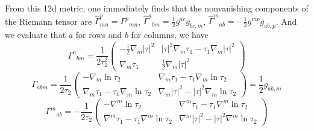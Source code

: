 From this 12d metric, one immediately finds that the nonvanishing components of the Riemann tensor are $\hat{\Gamma}^p_{mn} = \Gamma^p{}_{mn}$, $\hat{\Gamma}^a{}_{bm} = \frac{1}{2}g^{ac}g_{bc,m}$, $\hat{\Gamma}^m{}_{ab} = - \frac{1}{2}g^{mp}g_{ab,p}$.
And we evaluate that $a$ for rows and $b$ for columns, we have
\begin{equation}
\Gamma^a{}_{bm}
=\frac{1}{2 \tau_2^2}\begin{pmatrix}
    -\tfrac12 \nabla_m|\tau|^2 & |\tau|^2\nabla_m\tau_1 - \tau_1 \nabla_m|\tau|^2 \\
    \nabla_m\tau_1 & \tfrac12 \nabla_m|\tau|^2
\end{pmatrix}
\end{equation}
\begin{equation}
\Gamma_{abm}
= \frac{1}{2\tau_2}\begin{pmatrix}
    -\nabla_m\ln\tau_2
    & \nabla_m\tau_1 - \tau_1\nabla_m\ln\tau_2 \\
    \nabla_m\tau_1 - \tau_1\nabla_m\ln\tau_2 & \nabla_m|\tau|^2 - |\tau|^2\nabla_m\ln\tau_2
\end{pmatrix}
=\frac{1}{2}g_{ab,m}
\end{equation}
\begin{equation}
\Gamma^m{}_{ab} = -\frac{1}{2\tau_2}\begin{pmatrix}
    -\nabla^m\ln\tau_2 & \nabla^m\tau_1 - \tau_1\nabla^m\ln\tau_2 \\
    \nabla^m\tau_1-\tau_1\nabla^m\ln\tau_2 & \nabla^m|\tau|^2 - |\tau|^2\nabla^m\ln\tau_2
\end{pmatrix}
\end{equation}

